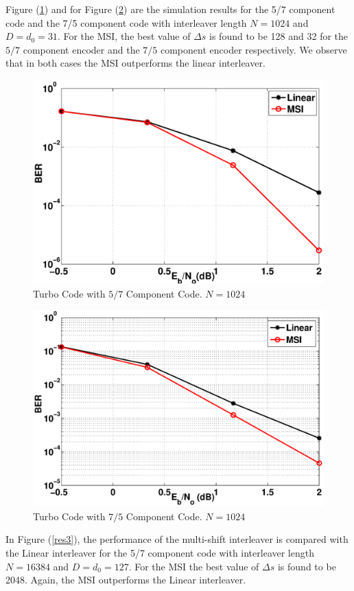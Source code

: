 \documentclass[a4paper, 12pt, oneside, openary]{jbook}
\begin{document}
 Figure (\ref{res1}) and for  Figure (\ref{res2}) are the simulation results for the 5/7 
 component code
 and the 7/5 component code with  interleaver length $N=1024$ and $D=d_0=31$. For
 the MSI, the best value of $\Delta s$ is found to be 128 and 32 for the
  $5/7$ component encoder and the
  $7/5$ component encoder respectively. We observe that in both cases
 the MSI outperforms the linear interleaver.
 \begin{figure}[h!]
\centering
		\includegraphics[width =\textwidth]{msi_linear_256_1000Frames_2.eps}
		\caption{Turbo Code with $5/7$ Component Code. $N=1024$}
		\label{res1}
		\end{figure}
		
		\begin{figure}[h!]
\centering
		\includegraphics[width =\textwidth]{msi_linear_1024_1000_7_5Frames.eps}
		\caption{Turbo Code with $7/5$ Component Code. $N=1024$}
		\label{res2}
		\end{figure}
 In Figure (\ref{res3}), the performance of the multi-shift 
interleaver is compared with the Linear interleaver for the 
5/7 component code with interleaver length $N=16384$ and $D=d_0=127$. For the MSI
the best value of $\Delta s$ is found to be 2048. Again, the MSI outperforms the 
Linear interleaver. 
\end{document}
